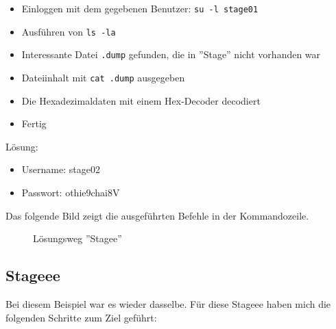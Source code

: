 \documentclass[12pt, a4paper, titlepage, oneside]{scrartcl}
\begin{document}
	\begin{itemize}
		\item Einloggen mit dem gegebenen Benutzer: \lstinline{su -l stage01}

		\item Ausführen von \lstinline{ls -la}

		\item Interessante Datei \lstinline{.dump} gefunden, die in ''Stage'' nicht vorhanden
			war

		\item Dateiinhalt mit \lstinline{cat .dump} ausgegeben

		\item Die Hexadezimaldaten mit einem Hex-Decoder decodiert

		\item Fertig
	\end{itemize}

	Lösung:
	\begin{itemize}
		\item Username: stage02

		\item Passwort: othie9chai8V
	\end{itemize}

	Das folgende Bild zeigt die ausgeführten Befehle in der Kommandozeile.
	\begin{figure}[h!]
		\centering
		\caption{Lösungsweg ''Stagee''}
		\label{fig:stagee_solution}
	\end{figure}

	\newpage

	\subsection{Stageee}
	Bei diesem Beispiel war es wieder dasselbe. Für diese Stageee haben mich die folgenden
	Schritte zum Ziel geführt:
\end{document}
